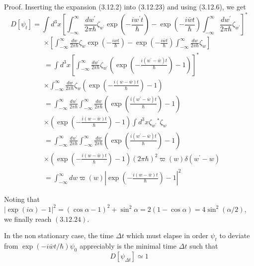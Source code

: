 \documentclass{article}
\begin{document}
Proof. Inserting the expansion (3.12.2) into (3.12.23) and using (3.12.6), we get
$$
D\left[\psi_{t}\right]=\int d^{3} x\left[\int_{-\infty}^{\infty} \frac{d w^{\prime}}{2 \pi \hbar} \zeta_{w^{\prime}} \exp \left(-\frac{i w^{\prime} t}{\hbar}\right)-\exp \left(-\frac{i \bar{w} t}{\hbar}\right) \int_{-\infty}^{\infty} \frac{d w^{\prime}}{2 \pi \hbar} \zeta_{w^{\prime}}\right]^{*}
$$
$$
\begin{align*}
& \times\left[\int_{-\infty}^{\infty} \frac{d w}{2 \pi \hbar} \zeta_{w} \exp \left(-\frac{i w t}{\hbar}\right)-\exp \left(-\frac{i \bar{w} t}{\hbar}\right) \int_{-\infty}^{\infty} \frac{d w}{2 \pi \hbar} \zeta_{w}\right] \\
& =\int d^{3} x\left[\int_{-\infty}^{\infty} \frac{d w^{\prime}}{2 \pi \hbar} \zeta_{w^{\prime}}\left(\exp \left(-\frac{i\left(w^{\prime}-\bar{w}\right) t}{\hbar}\right)-1\right)\right]^{*}  \tag{3.12.25}\\
& \times \int_{-\infty}^{\infty} \frac{d w}{2 \pi \hbar} \zeta_{w}\left(\exp \left(-\frac{i(w-\bar{w}) t}{\hbar}\right)-1\right) \\
& =\int_{-\infty}^{\infty} \frac{d w^{\prime}}{2 \pi \hbar} \int_{-\infty}^{\infty} \frac{d w}{2 \pi \hbar}\left(\exp \left(\frac{i\left(w^{\prime}-\bar{w}\right) t}{\hbar}\right)-1\right) \\
& \times\left(\exp \left(-\frac{i(w-\bar{w}) t}{\hbar}\right)-1\right) \int d^{3} x \zeta_{w^{\prime}}{ }^{*} \zeta_{w} \\
& =\int_{-\infty}^{\infty} \frac{d w^{\prime}}{2 \pi \hbar} \int_{-\infty}^{\infty} \frac{d w}{2 \pi \hbar}\left(\exp \left(\frac{i\left(w^{\prime}-\bar{w}\right) t}{\hbar}\right)-1\right) \\
& \times\left(\exp \left(-\frac{i(w-\bar{w}) t}{\hbar}\right)-1\right)(2 \pi \hbar)^{2} \varpi(w) \delta\left(w^{\prime}-w\right) \\
& =\int_{-\infty}^{\infty} d w \varpi(w)\left|\exp \left(-\frac{i(w-\bar{w}) t}{\hbar}\right)-1\right|^{2}
\end{align*}
$$

Noting that $|\exp (i \alpha)-1|^{2}=(\cos \alpha-1)^{2}+\sin ^{2} \alpha=2(1-\cos \alpha)=4 \sin ^{2}(\alpha / 2)$, we finally reach $(3.12 .24)$.

In the non stationary case, the time $\Delta t$ which must elapse in order $\psi_{t}$ to deviate from $\exp (-i \bar{w} t / \hbar) \psi_{0}$ appreciably is the minimal time $\Delta t$ such that
$$
\begin{equation*}
D\left[\psi_{\Delta t}\right] \simeq 1 \tag{3.12.26}
\end{equation*}
$$
\end{document}
